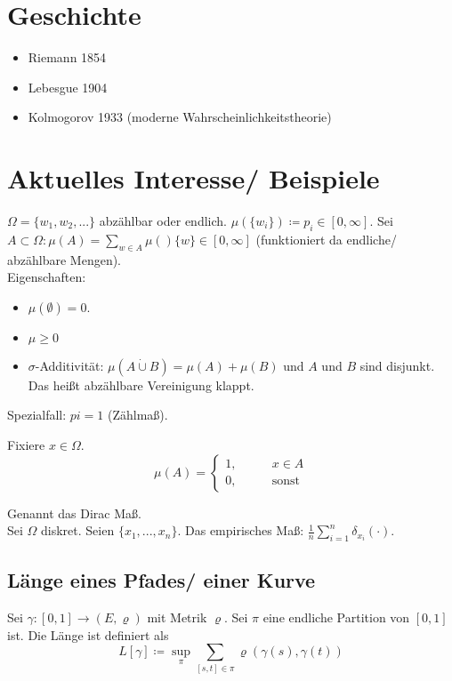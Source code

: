 \documentclass[a4paper, landscape,twocolumn,fontsize=9pt]{scrartcl}
\begin{document}
\section{Geschichte}
\begin{itemize}
	\item Riemann 1854 
	\item Lebesgue 1904
	\item Kolmogorov 1933 (moderne Wahrscheinlichkeitstheorie)
\end{itemize}

\section{Aktuelles Interesse/ Beispiele}
\begin{example}{}{}
	$\Omega = \{ w_1, w_2, ...\}$ abzählbar oder endlich. $\mu( \{ w_i\}) \coloneqq p_i \in [0, \infty]$. Sei $A \subset \Omega: \mu (A) = \sum_{w \in A} \mu() \{w \} \in [0, \infty]$ (funktioniert da endliche/ abzählbare Mengen). \\
	
	Eigenschaften:
	\begin{itemize}
		\item $\mu (\emptyset) = 0$.
		\item $\mu \geq 0$
		\item $\sigma$-Additivität: $\mu(A  \dot \cup B) = \mu(A) + \mu(B)$ und $A$ und $B$ sind disjunkt. Das heißt abzählbare Vereinigung klappt.
	\end{itemize}
	
	Spezialfall: $pi = 1$ (Zählmaß).
	
	Fixiere $x \in \Omega$. $$\mu(A) = \begin{cases}
 		1 , \qquad &x \in A \\
 		0, &\text{sonst}	
 \end{cases}
$$  
\end{example}
Genannt das Dirac Maß.\\

Sei $\Omega$ diskret. Seien $\{x_1,...,x_n\}$. Das empirisches Maß: $\frac{1}{n} \sum^n_{i=1} \delta_{x_i} (\cdot)$.

\subsection{Länge eines Pfades/ einer Kurve}
Sei $\gamma: [0,1] \to (E, \varrho)$ mit Metrik $\varrho$. Sei $\pi$ eine endliche Partition von $[0,1]$ ist. Die Länge ist definiert als
\[
	L[\gamma] \coloneqq \sup_{\pi} \sum_{[s,t] \in \pi} \varrho(\gamma(s), \gamma(t))
\]
\end{document}
